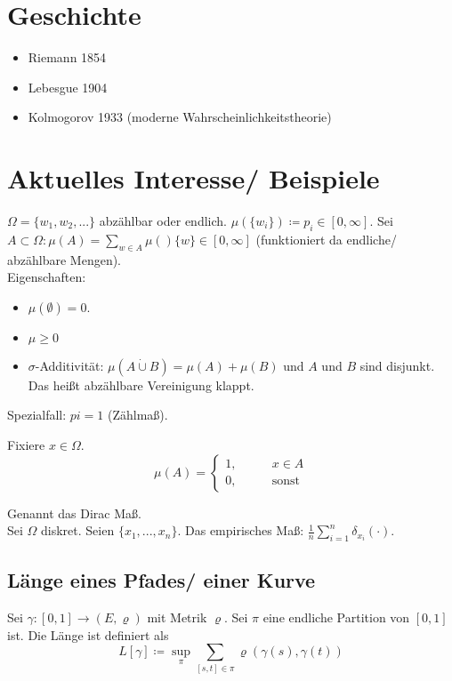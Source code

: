 \documentclass[a4paper, landscape,twocolumn,fontsize=9pt]{scrartcl}
\begin{document}
\section{Geschichte}
\begin{itemize}
	\item Riemann 1854 
	\item Lebesgue 1904
	\item Kolmogorov 1933 (moderne Wahrscheinlichkeitstheorie)
\end{itemize}

\section{Aktuelles Interesse/ Beispiele}
\begin{example}{}{}
	$\Omega = \{ w_1, w_2, ...\}$ abzählbar oder endlich. $\mu( \{ w_i\}) \coloneqq p_i \in [0, \infty]$. Sei $A \subset \Omega: \mu (A) = \sum_{w \in A} \mu() \{w \} \in [0, \infty]$ (funktioniert da endliche/ abzählbare Mengen). \\
	
	Eigenschaften:
	\begin{itemize}
		\item $\mu (\emptyset) = 0$.
		\item $\mu \geq 0$
		\item $\sigma$-Additivität: $\mu(A  \dot \cup B) = \mu(A) + \mu(B)$ und $A$ und $B$ sind disjunkt. Das heißt abzählbare Vereinigung klappt.
	\end{itemize}
	
	Spezialfall: $pi = 1$ (Zählmaß).
	
	Fixiere $x \in \Omega$. $$\mu(A) = \begin{cases}
 		1 , \qquad &x \in A \\
 		0, &\text{sonst}	
 \end{cases}
$$  
\end{example}
Genannt das Dirac Maß.\\

Sei $\Omega$ diskret. Seien $\{x_1,...,x_n\}$. Das empirisches Maß: $\frac{1}{n} \sum^n_{i=1} \delta_{x_i} (\cdot)$.

\subsection{Länge eines Pfades/ einer Kurve}
Sei $\gamma: [0,1] \to (E, \varrho)$ mit Metrik $\varrho$. Sei $\pi$ eine endliche Partition von $[0,1]$ ist. Die Länge ist definiert als
\[
	L[\gamma] \coloneqq \sup_{\pi} \sum_{[s,t] \in \pi} \varrho(\gamma(s), \gamma(t))
\]
\end{document}
